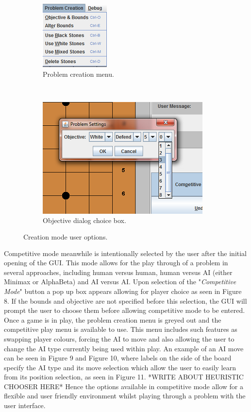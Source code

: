 \documentclass{l3proj}
\begin{document}
\begin{figure}[H]
\begin{subfigure}[H]{0.2\textwidth}
\includegraphics[scale=1]{Images/GUI-6-PCMenu.png}
\caption{Problem creation menu.}
\end{subfigure}
~~~~~~~~~~~~~~~~~~~~~~~~~~~
\begin{subfigure}[H]{0.3\textwidth}
\includegraphics[scale=1]{Images/GUI-7-Objective.png}
\caption{Objective dialog choice box.}
\end{subfigure}
\caption{Creation mode user options.}
\end{figure}

Competitive mode meanwhile is intentionally selected by the user after the initial opening of the GUI. This mode allows for the play through of a problem in several approaches, including human versus human, human versus AI (either Minimax or AlphaBeta) and AI versus AI. Upon selection of the "\textit{Competitive Mode}" button a pop up box appears allowing for player choice as seen in Figure 8. If the bounds and objective are not specified before this selection, the GUI will prompt the user to choose them before allowing competitive mode to be entered. Once a game is in play, the problem creation menu is greyed out and the competitive play menu is available to use. This menu includes such features as swapping player colours, forcing the AI to move and also allowing the user to change the AI type currently being used within play. An example of an AI move can be seen in Figure 9 and Figure 10, where labels on the side of the board specify the AI type and its move selection which allow the user to easily learn from its position selection, as seen in Figure 11. *WRITE ABOUT HEURISTIC CHOOSER HERE* Hence the options available in competitive mode allow for a flexible and user friendly environment whilst playing through a problem with the user interface.
\end{document}
